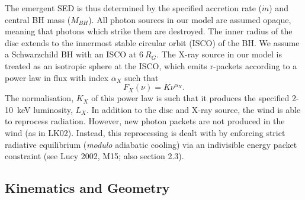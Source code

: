 \documentclass[useAMS,usenatbib]{mn2e_x}
\begin{document}
The emergent SED is thus determined by the specified accretion rate ($\dot{m}$)
and central BH mass ($M_{BH}$).
All photon sources in our model are assumed opaque, meaning
that photons which strike them are destroyed.
The inner radius of the disc extends to the innermost 
stable circular orbit (ISCO) of the BH. 
We assume a Schwarzchild BH with an ISCO at $6~R_G$.
The X-ray source in our model is treated as an isotropic sphere at the ISCO,
which emits r-packets according to a power law in flux with index $\alpha_X$ such that
\begin{equation}
F_X (\nu) = K \nu^{\alpha_X}.
\end{equation}
The normalisation, $K_X$ of this power law is such that it 
produces the specified 2-10~keV luminosity, $L_X$.
In addition to the disc and X-ray source, 
the wind is able to reprocess radiation. However, new 
photon packets are not produced in the wind (as in LK02). 
Instead, this reprocessing is dealt with by enforcing strict
radiative equilibrium ({\em modulo} adiabatic cooling)
via an indivisible energy packet
constraint (see Lucy 2002, M15; also section 2.3).









\subsection{Kinematics and Geometry}
\end{document}
